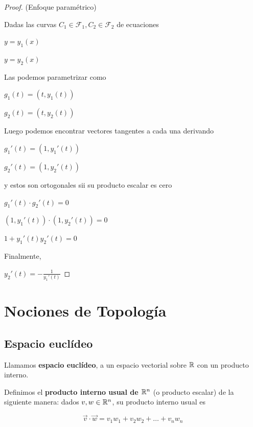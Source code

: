 \begin{proof} (Enfoque paramétrico)

Dadas las curvas $C_1 \in \mathcal{F}_1, C_2 \in \mathcal{F}_2$ de ecuaciones

$ y = y_1(x)$

$ y = y_2(x)$ 

Las podemos parametrizar como

$ g_1(t) = (t, y_1(t) )$

$ g_2(t) = (t, y_2(t) )$

Luego podemos encontrar vectores tangentes a cada una derivando

$ g_1'(t) = (1, y_1'(t) )$

$ g_2'(t) = (1, y_2'(t) )$

y estos son ortogonales sii su producto escalar es cero

$ g_1'(t) \cdot g_2'(t) = 0$

$ (1,y_1'(t)) \cdot (1, y_2'(t)) = 0$

$ 1 + y_1'(t) y_2'(t) = 0$

Finalmente,

$ y_2'(t) = -\frac{1}{y_1'(t)}$
\end{proof}




\chapter{Nociones de Topología}

\section{Espacio euclídeo}

\begin{definition} \label{espacio euclideo}
Llamamos \textbf{espacio euclídeo},  a un espacio vectorial sobre $\mathbb{R}$ con un producto interno. 
\end{definition}

\begin{definition} \label{producto escalar}
Definimos el \textbf{producto interno usual de $\mathbb{R}^n$} (o producto escalar)  de la siguiente manera: dados $v,w \in \mathbb{R}^n$, su producto interno usual es

$$ \vec{v} \cdot \vec{w} = v_1w_1 + v_2w_2 + \ldots + v_nw_n $$
\end{definition}

